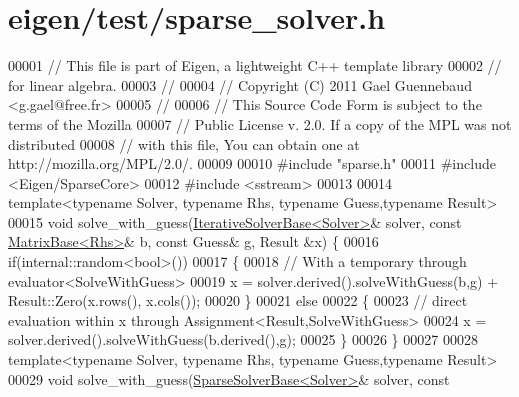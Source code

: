 \hypertarget{eigen_2test_2sparse__solver_8h_source}{}\section{eigen/test/sparse\+\_\+solver.h}
\label{eigen_2test_2sparse__solver_8h_source}

\begin{DoxyCode}
00001 \textcolor{comment}{// This file is part of Eigen, a lightweight C++ template library}
00002 \textcolor{comment}{// for linear algebra.}
00003 \textcolor{comment}{//}
00004 \textcolor{comment}{// Copyright (C) 2011 Gael Guennebaud <g.gael@free.fr>}
00005 \textcolor{comment}{//}
00006 \textcolor{comment}{// This Source Code Form is subject to the terms of the Mozilla}
00007 \textcolor{comment}{// Public License v. 2.0. If a copy of the MPL was not distributed}
00008 \textcolor{comment}{// with this file, You can obtain one at http://mozilla.org/MPL/2.0/.}
00009 
00010 \textcolor{preprocessor}{#include "sparse.h"}
00011 \textcolor{preprocessor}{#include <Eigen/SparseCore>}
00012 \textcolor{preprocessor}{#include <sstream>}
00013 
00014 \textcolor{keyword}{template}<\textcolor{keyword}{typename} Solver, \textcolor{keyword}{typename} Rhs, \textcolor{keyword}{typename} Guess,\textcolor{keyword}{typename} Result>
00015 \textcolor{keywordtype}{void} solve\_with\_guess(\hyperlink{group___iterative_linear_solvers___module_class_eigen_1_1_iterative_solver_base}{IterativeSolverBase<Solver>}& solver, \textcolor{keyword}{const} 
      \hyperlink{group___core___module_class_eigen_1_1_matrix_base}{MatrixBase<Rhs>}& b, \textcolor{keyword}{const} Guess& g, Result &x) \{
00016   \textcolor{keywordflow}{if}(internal::random<bool>())
00017   \{
00018     \textcolor{comment}{// With a temporary through evaluator<SolveWithGuess>}
00019     x = solver.derived().solveWithGuess(b,g) + Result::Zero(x.rows(), x.cols());
00020   \}
00021   \textcolor{keywordflow}{else}
00022   \{
00023     \textcolor{comment}{// direct evaluation within x through Assignment<Result,SolveWithGuess>}
00024     x = solver.derived().solveWithGuess(b.derived(),g);
00025   \}
00026 \}
00027 
00028 \textcolor{keyword}{template}<\textcolor{keyword}{typename} Solver, \textcolor{keyword}{typename} Rhs, \textcolor{keyword}{typename} Guess,\textcolor{keyword}{typename} Result>
00029 \textcolor{keywordtype}{void} solve\_with\_guess(\hyperlink{group___sparse_core___module_class_eigen_1_1_sparse_solver_base}{SparseSolverBase<Solver>}& solver, \textcolor{keyword}{const} 

\end{DoxyCode}
